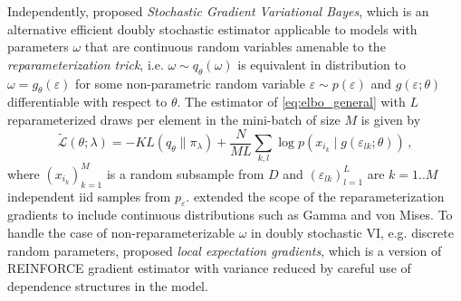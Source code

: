 \documentclass[a4paper,10pt,twocolumn]{article}
\begin{document}
Independently, \citet{kingma_auto-encoding_2014} proposed \emph{Stochastic Gradient
Variational Bayes}, which is an alternative efficient doubly stochastic estimator
applicable to models with parameters $\omega$ that are continuous random variables
amenable to the \emph{reparameterization trick}, i.e. $
  \omega \sim q_{\theta}(\omega)
$ is equivalent in distribution to $
  \omega = g_{\theta}(\varepsilon)
$ for some non-parametric random variable $
  \varepsilon \sim p(\varepsilon)
$ and $
  g(\varepsilon; \theta)
$ differentiable with respect to $\theta$. The estimator of \eqref{eq:elbo_general}
with $L$ reparameterized draws per element in the mini-batch of size $M$ is given by
\begin{equation}  \label{eq:sgvb_estimator}
  \widetilde{\mathcal{L}}(\theta; \lambda)
    = - KL(q_{\theta} \| \pi_{\lambda})
      + \frac{N}{M L} \sum_{k,l}
        \log p(x_{i_k} \mid g(\varepsilon_{lk}; \theta))
    \,,
\end{equation}
where $(x_{i_k})_{k=1}^M$ is a random subsample from $D$ and $
  (\varepsilon_{lk})_{l=1}^L
$ are $k=1..M$ independent iid samples from $p_\varepsilon$. \citet{figurnov_implicit_2018}
extended the scope of the reparameterization gradients to include continuous distributions
such as Gamma and von Mises. To handle the case of non-reparameterizable $\omega$ in
doubly stochastic VI, e.g. discrete random parameters, \citet{titsias_local_2015} proposed
\emph{local expectation gradients}, which is a version of REINFORCE gradient estimator
\citep{williams_simple_1992} with variance reduced by careful use of dependence
structures in the model.
\end{document}
